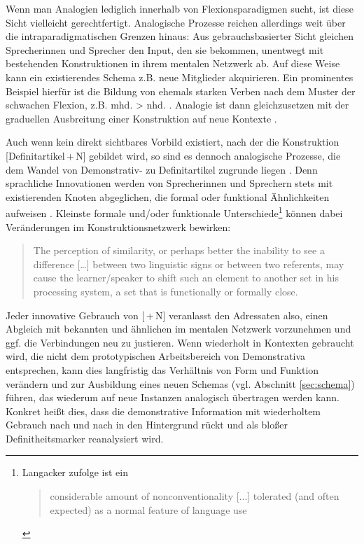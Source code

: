 Wenn man Analogien lediglich innerhalb von Flexionsparadigmen sucht, ist diese Sicht vielleicht gerechtfertigt. Analogische Prozesse reichen allerdings weit über die intraparadigmatischen Grenzen hinaus: Aus gebrauchsbasierter Sicht gleichen Sprecherinnen und Sprecher den Input, den sie bekommen, unentwegt mit bestehenden Konstruktionen in ihrem mentalen Netzwerk ab. Auf diese Weise kann ein existierendes Schema z.B. neue Mitglieder akquirieren. Ein prominentes Beispiel hierfür ist die Bildung von ehemals starken Verben nach dem Muster der schwachen Flexion, z.B. mhd.  > nhd.  \parencite{Bittner1985}. Analogie ist dann gleichzusetzen mit der graduellen Ausbreitung einer Konstruktion auf neue Kontexte \parencite[57--58]{Bybee2010}. %

Auch wenn kein direkt sichtbares Vorbild existiert, nach der die Konstruktion [Definitartikel\,+\,N] gebildet wird, so sind es dennoch analogische Prozesse, die dem  Wandel von Demonstrativ- zu Definitartikel zugrunde liegen \parencite[eine ähnliche Perspektive nimmt auch Sommerer bei der Entwicklung des engl. Definitartikels ein, s.][]{Sommerer2011}. Denn sprachliche Innovationen werden von Sprecherinnen und Sprechern stets mit existierenden Knoten abgeglichen, die formal oder funktional Ähnlichkeiten aufweisen \parencite[51]{Traugott2013}. Kleinste formale und/oder funktionale Unterschiede\footnote{Langacker zufolge ist ein \blockcquote[69]{Langacker1987}{considerable amount of nonconventionality [...] tolerated (and often expected) as a normal feature of language use}.}
 können dabei Veränderungen im Konstruktionsnetzwerk bewirken:  \blockcquote[324]{Fischer2007} {The perception of similarity, or perhaps better the inability to see a difference […] between two linguistic signs or between two referents, may cause the learner/speaker to shift such an element to another set in his processing system, a set that is functionally or formally close.} Jeder innovative Gebrauch von [\,+\,N] veranlasst den Adressaten also, einen Abgleich mit bekannten und ähnlichen  \parencite[60]{Bybee2010} im mentalen Netzwerk vorzunehmen und ggf. die Verbindungen neu zu justieren. Wenn  wiederholt in Kontexten gebraucht wird, die nicht dem prototypischen Arbeitsbereich von Demonstrativa entsprechen, kann dies langfristig das Verhältnis von Form und Funktion verändern und zur Ausbildung eines neuen Schemas (vgl. Abschnitt \ref{sec:schema}) führen, das wiederum auf neue Instanzen analogisch übertragen werden kann. Konkret heißt dies, dass die demonstrative Information mit wiederholtem Gebrauch nach und nach in den Hintergrund rückt und  als bloßer Definitheitsmarker reanalysiert wird.

